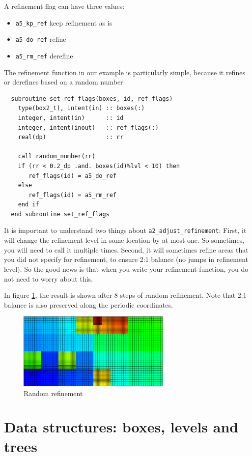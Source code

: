 \documentclass[a4paper, a4wide]{article}
\begin{document}
A refinement flag can have three values:
\begin{itemize}
  \item \texttt{a5\_kp\_ref} keep refinement as is
  \item \texttt{a5\_do\_ref} refine
  \item \texttt{a5\_rm\_ref} derefine
\end{itemize}
The refinement function in our example is particularly simple, because it
refines or derefines based on a random number:
\begin{lstlisting}
  subroutine set_ref_flags(boxes, id, ref_flags)
    type(box2_t), intent(in) :: boxes(:)
    integer, intent(in)      :: id
    integer, intent(inout)   :: ref_flags(:)
    real(dp)                 :: rr

    call random_number(rr)
    if (rr < 0.2_dp .and. boxes(id)%lvl < 10) then
       ref_flags(id) = a5_do_ref
    else
       ref_flags(id) = a5_rm_ref
    end if
  end subroutine set_ref_flags
\end{lstlisting}

It is important to understand two things about \texttt{a2\_adjust\_refinement}:
First, it will change the refinement level in some location by at most one.
So sometimes, you will need to call it multiple times.
Second, it will sometimes refine areas that you did not specify for refinement,
to ensure 2:1 balance (no jumps in refinement level).
So the good news is that when you write your refinement function, you do not
need to worry about this.

In figure \ref{fig:random-refinement}, the result is shown after 8 steps of
random refinement.
Note that 2:1 balance is also preserved along the periodic coordinates.

\begin{figure}
  \centering
  \includegraphics[width=7.5cm]{figures/random_ref.png}
  \caption{Random refinement}
  \label{fig:random-refinement}
\end{figure}

\section{Data structures: boxes, levels and trees}
\label{sec:data-structures}
\end{document}
